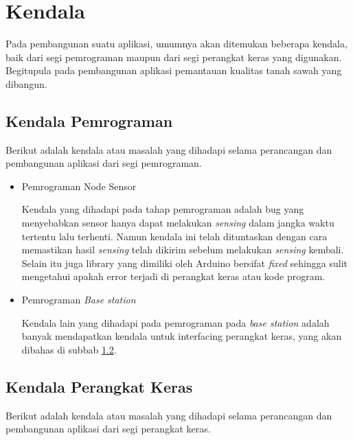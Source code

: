 \section{Kendala}
\label{sec:latex}

    Pada pembangunan suatu aplikasi, umumnya akan ditemukan beberapa kendala, baik dari segi pemrograman maupun dari segi perangkat keras yang digunakan. Begitupula pada pembangunan aplikasi pemantauan kualitas tanah sawah yang dibangun.
    
    \subsection{Kendala Pemrograman}
    Berikut adalah kendala atau masalah yang dihadapi selama perancangan dan pembangunan aplikasi dari segi pemrograman.
    
    \begin{itemize}
        \item Pemrograman Node Sensor
        
         Kendala yang dihadapi pada tahap pemrograman adalah bug yang menyebabkan sensor hanya dapat melakukan \textit{sensing} dalam jangka waktu tertentu lalu terhenti. Namun kendala ini telah dituntaskan dengan cara memastikan hasil \textit{sensing} telah dikirim sebelum melakukan \textit{sensing} kembali. Selain itu juga library yang dimiliki oleh Arduino bersifat \textit{fixed} sehingga sulit mengetahui apakah error terjadi di perangkat keras atau kode program.
        
        \item Pemrograman \textit{Base station}
        
        Kendala lain yang dihadapi pada pemrograman pada \textit{base station} adalah banyak mendapatkan kendala untuk interfacing perangkat keras, yang akan dibahas di subbab \ref{kendala perangkat keras}.
        
        
    \end{itemize}
   
   
   \subsection{Kendala Perangkat Keras}
   \label{kendala perangkat keras}
   Berikut adalah kendala atau masalah yang dihadapi selama perancangan dan pembangunan aplikasi dari segi perangkat keras.
   
